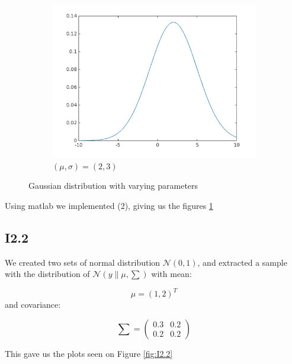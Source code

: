 \documentclass{article}
\begin{document}
\begin{figure}[!ht]
\begin{subfigure}[b]{0.4\textwidth}
        \includegraphics[width=\textwidth]{part1/I213.png}
        \caption{$(\mu, \sigma) = (2,3)$}
    \end{subfigure}
    \caption{Gaussian distribution with varying parameters}
    \label{fig:I1.1}
\end{figure}

Using matlab we implemented (2), giving us the figures \ref{fig:I1.1}

\subsection{I2.2}


We created two sets of normal distribution $\mathscr{N}(0,1)$, and extracted a sample with the distribution of $\mathscr{N}(y \| \mu, \sum)$ 
with mean:

\begin{equation}\label{eq:2.2mean}
    \mu = (1,2)^T
\end{equation} 
and covariance:

\begin{equation}\label{eq:2.2co}
    \sum = \left( \begin{array}{cc} 0.3 & 0.2 \\ 0.2 & 0.2 \end{array} \right)
\end{equation}


This gave us the plots seen on Figure \ref{fig:I2.2}
\end{document}
